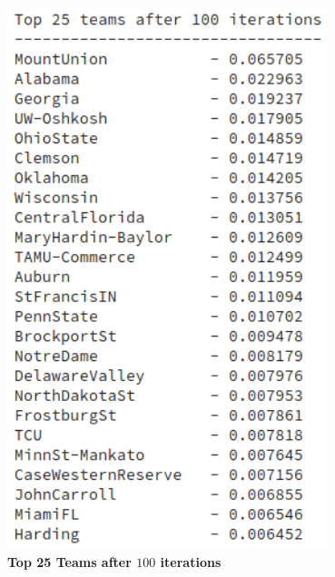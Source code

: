\documentclass[openany,11pt]{homework}
\begin{document}
\begin{center}
	\centering
	\includegraphics[width = 0.70\textwidth]{1b-100.png}
	\\
	\textbf{Top 25 Teams after $100$ iterations}
\end{center}
\end{document}
